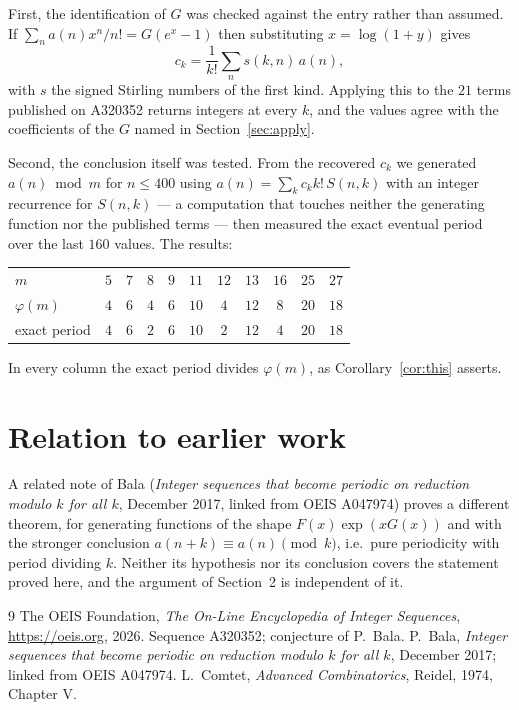 \documentclass[11pt,a4paper]{article}
\theoremstyle{plain}
\theoremstyle{definition}
\begin{document}
First, the identification of $G$ was checked against the entry rather than assumed. If
$\sum_{n}a(n)x^{n}/n!=G(e^{x}-1)$ then substituting $x=\log(1+y)$ gives
\[
c_{k}=\frac{1}{k!}\sum_{n}s(k,n)\,a(n),
\]
with $s$ the signed Stirling numbers of the first kind. Applying this to the
$21$ terms published on A320352 returns integers at every $k$, and the values
agree with the coefficients of the $G$ named in Section~\ref{sec:apply}.

Second, the conclusion itself was tested. From the recovered $c_{k}$ we generated
$a(n)\bmod m$ for $n\le400$ using $a(n)=\sum_{k}c_{k}k!\,S(n,k)$ with an integer
recurrence for $S(n,k)$ --- a computation that touches neither the generating function nor
the published terms --- then measured the exact eventual period over the last $160$
values. The results:

\begin{center}
\begin{tabular}{@{}lcccccccccc@{}}
\toprule
$m$  & $5$ & $7$ & $8$ & $9$ & $11$ & $12$ & $13$ & $16$ & $25$ & $27$\\
$\varphi(m)$  & $4$ & $6$ & $4$ & $6$ & $10$ & $4$ & $12$ & $8$ & $20$ & $18$\\
exact period  & $4$ & $6$ & $2$ & $6$ & $10$ & $2$ & $12$ & $4$ & $20$ & $18$\\
\bottomrule
\end{tabular}
\end{center}

\noindent
In every column the exact period divides $\varphi(m)$, as Corollary~\ref{cor:this}
asserts.

\section{Relation to earlier work}

A related note of Bala (\emph{Integer sequences that become periodic on reduction modulo
$k$ for all $k$}, December 2017, linked from OEIS A047974) proves a different theorem, for
generating functions of the shape $F(x)\exp(xG(x))$ and with the stronger conclusion
$a(n+k)\equiv a(n)\pmod{k}$, i.e.\ pure periodicity with period dividing $k$. Neither its
hypothesis nor its conclusion covers the statement proved here, and the argument of
Section~2 is independent of it.

\begin{thebibliography}{9}
 The OEIS Foundation, \emph{The On-Line Encyclopedia of Integer Sequences},
\url{https://oeis.org}, 2026. Sequence A320352; conjecture of P.\ Bala.
 P.\ Bala, \emph{Integer sequences that become periodic on reduction modulo
$k$ for all $k$}, December 2017; linked from OEIS A047974.
 L.\ Comtet, \emph{Advanced Combinatorics}, Reidel, 1974, Chapter V.
\end{thebibliography}
\end{document}
